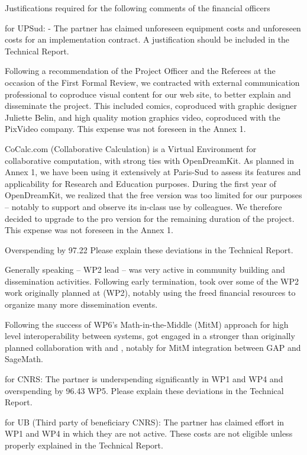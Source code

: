 
Justifications required for the following comments of the financial officers 

for UPSud:
- The partner has claimed unforeseen equipment costs and unforeseen costs for an
implementation contract. A justification should be included in the Technical Report.

Following a recommendation of the Project Officer and the Referees at
the occasion of the First Formal Review, we contracted with external
communication professional to coproduce visual content for our web
site, to better explain and disseminate the project. This included
comics, coproduced with graphic designer Juliette Belin, and high
quality motion graphics video, coproduced with the PixVideo company.
This expense was not foreseen in the Annex 1.

CoCalc.com (Collaborative Calculation) is a Virtual Environment for
collaborative computation, with strong ties with OpenDreamKit. As
planned in Annex 1, we have been using it extensively at Paris-Sud to
assess its features and applicability for Research and Education
purposes. During the first year of OpenDreamKit, we realized that the
free version was too limited for our purposes -- notably to support
and observe its in-class use by colleagues. We therefore decided to
upgrade to the pro version for the remaining duration of the project.
This expense was not foreseen in the Annex 1.

Overspending by 97.22%
Please explain these deviations in the Technical Report.

Generally speaking  -- WP2 lead -- was very active in
community building and dissemination activities. Following
 early termination,  took over some of the WP2
work originally planned at  (WP2), notably using the freed
financial resources to organize many more dissemination events.

Following the success of WP6's Math-in-the-Middle (MitM) approach for
high level interoperability between systems,  got engaged in
a stronger than originally planned collaboration with  and
, notably for MitM integration between GAP and SageMath.

for CNRS:
The partner is underspending significantly in WP1 and WP4 and overspending by 96.43%
WP5. Please explain these deviations in the Technical Report.

for UB (Third party of beneficiary CNRS):
The partner has claimed effort in WP1 and WP4 in which they are not active. These costs are
not eligible unless properly explained in the Technical Report.

